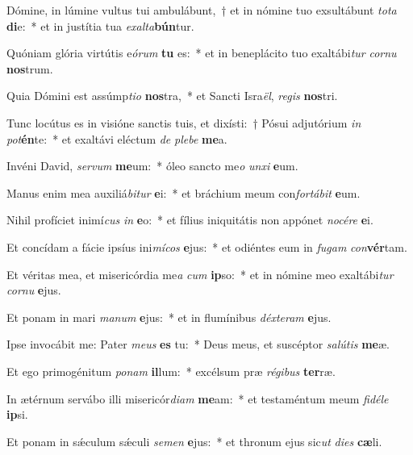 \item Dómine, in lúmine vultus tui ambulábunt,~† et in nómine tuo exsultábunt \textit{to}\textit{ta} \textbf{di}e:~* et in justítia tua \textit{ex}\textit{al}\textit{ta}\textbf{bún}tur.
\item Quóniam glória virtútis e\textit{ó}\textit{rum} \textbf{tu} es:~* et in beneplácito tuo exaltábi\textit{tur} \textit{cor}\textit{nu} \textbf{nos}trum.
\item Quia Dómini est assúmp\textit{ti}\textit{o} \textbf{nos}tra,~* et Sancti Isra\textit{ël}, \textit{re}\textit{gis} \textbf{nos}tri.
\item Tunc locútus es in visióne sanctis tuis, et dixísti:~† Pósui adjutórium \textit{in} \textit{pot}\textbf{én}te:~* et exaltávi eléctum \textit{de} \textit{ple}\textit{be} \textbf{me}a.
\item Invéni David, \textit{ser}\textit{vum} \textbf{me}um:~* óleo sancto me\textit{o} \textit{un}\textit{xi} \textbf{e}um.
\item Manus enim mea auxiliá\textit{bi}\textit{tur} \textbf{e}i:~* et bráchium meum con\textit{for}\textit{tá}\textit{bit} \textbf{e}um.
\item Nihil profíciet inimí\textit{cus} \textit{in} \textbf{e}o:~* et fílius iniquitátis non appónet \textit{no}\textit{cé}\textit{re} \textbf{e}i.
\item Et concídam a fácie ipsíus ini\textit{mí}\textit{cos} \textbf{e}jus:~* et odiéntes eum in \textit{fu}\textit{gam} \textit{con}\textbf{vér}tam.
\item Et véritas mea, et misericórdia me\textit{a} \textit{cum} \textbf{ip}so:~* et in nómine meo exaltábi\textit{tur} \textit{cor}\textit{nu} \textbf{e}jus.
\item Et ponam in mari \textit{ma}\textit{num} \textbf{e}jus:~* et in flumínibus \textit{déx}\textit{te}\textit{ram} \textbf{e}jus.
\item Ipse invocábit me: Pater \textit{me}\textit{us} \textbf{es} tu:~* Deus meus, et suscéptor \textit{sa}\textit{lú}\textit{tis} \textbf{me}æ.
\item Et ego primogénitum \textit{po}\textit{nam} \textbf{il}lum:~* excélsum præ \textit{ré}\textit{gi}\textit{bus} \textbf{ter}ræ.
\item In ætérnum servábo illi misericór\textit{di}\textit{am} \textbf{me}am:~* et testaméntum meum \textit{fi}\textit{dé}\textit{le} \textbf{ip}si.
\item Et ponam in sǽculum sǽculi \textit{se}\textit{men} \textbf{e}jus:~* et thronum ejus sic\textit{ut} \textit{di}\textit{es} \textbf{cæ}li.
